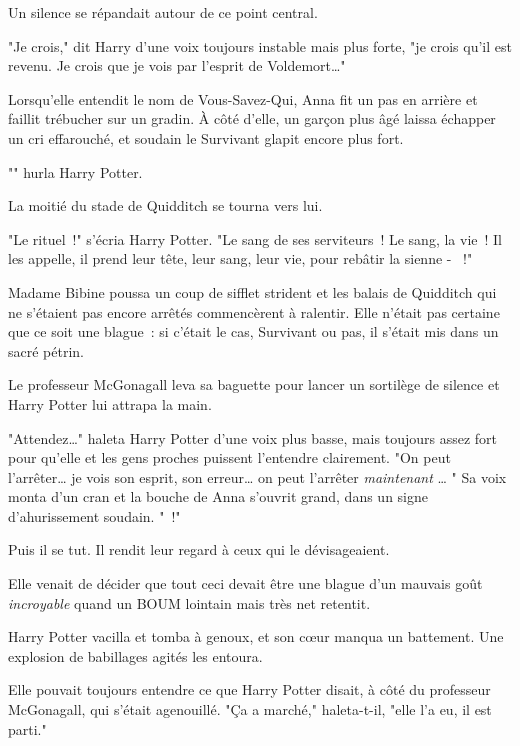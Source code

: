 Un silence se répandait autour de ce point central.

"Je crois," dit Harry d'une voix toujours instable mais plus forte, "je crois qu'il est revenu. Je crois que je vois par l'esprit de Voldemort…"

Lorsqu'elle entendit le nom de Vous-Savez-Qui, Anna fit un pas en arrière et faillit trébucher sur un gradin. À côté d'elle, un garçon plus âgé laissa échapper un cri effarouché, et soudain le Survivant glapit encore plus fort.

"" hurla Harry Potter.

La moitié du stade de Quidditch se tourna vers lui.

"Le rituel~!" s'écria Harry Potter. "Le sang de ses serviteurs~! Le sang, la vie~! Il les appelle, il prend leur tête, leur sang, leur vie, pour rebâtir la sienne - ~!"

Madame Bibine poussa un coup de sifflet strident et les balais de Quidditch qui ne s'étaient pas encore arrêtés commencèrent à ralentir. Elle n'était pas certaine que ce soit une blague~: si c'était le cas, Survivant ou pas, il s'était mis dans un sacré pétrin.

Le professeur McGonagall leva sa baguette pour lancer un sortilège de silence et Harry Potter lui attrapa la main.

"Attendez…" haleta Harry Potter d'une voix plus basse, mais toujours assez fort pour qu'elle et les gens proches puissent l'entendre clairement. "On peut l'arrêter… je vois son esprit, son erreur… on peut l'arrêter \emph{maintenant} … " Sa voix monta d'un cran et la bouche de Anna s'ouvrit grand, dans un signe d'ahurissement soudain. "~!"

Puis il se tut. Il rendit leur regard à ceux qui le dévisageaient.

Elle venait de décider que tout ceci devait être une blague d'un mauvais goût \emph{incroyable} quand un BOUM lointain mais très net retentit.

Harry Potter vacilla et tomba à genoux, et son cœur manqua un battement. Une explosion de babillages agités les entoura.

Elle pouvait toujours entendre ce que Harry Potter disait, à côté du professeur McGonagall, qui s'était agenouillé. "Ça a marché," haleta-t-il, "elle l'a eu, il est parti."

